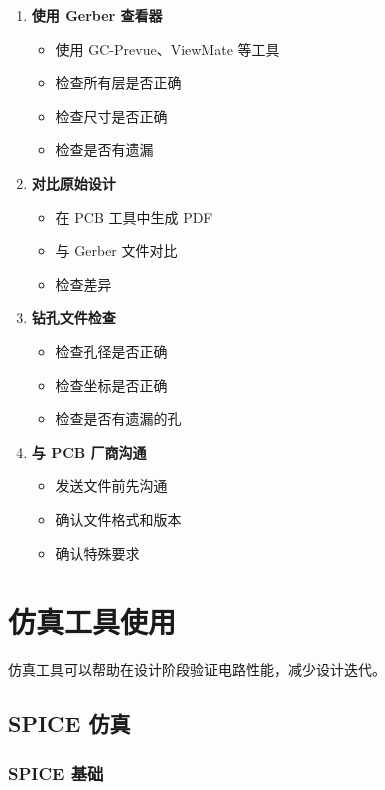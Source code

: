 \begin{enumerate}
  \item \textbf{使用 Gerber 查看器}
    \begin{itemize}
      \item 使用 GC-Prevue、ViewMate 等工具
      \item 检查所有层是否正确
      \item 检查尺寸是否正确
      \item 检查是否有遗漏
    \end{itemize}

  \item \textbf{对比原始设计}
    \begin{itemize}
      \item 在 PCB 工具中生成 PDF
      \item 与 Gerber 文件对比
      \item 检查差异
    \end{itemize}

  \item \textbf{钻孔文件检查}
    \begin{itemize}
      \item 检查孔径是否正确
      \item 检查坐标是否正确
      \item 检查是否有遗漏的孔
    \end{itemize}

  \item \textbf{与 PCB 厂商沟通}
    \begin{itemize}
      \item 发送文件前先沟通
      \item 确认文件格式和版本
      \item 确认特殊要求
    \end{itemize}
\end{enumerate}

\section{仿真工具使用}

仿真工具可以帮助在设计阶段验证电路性能，减少设计迭代。

\subsection{SPICE 仿真}

\subsubsection{SPICE 基础}

